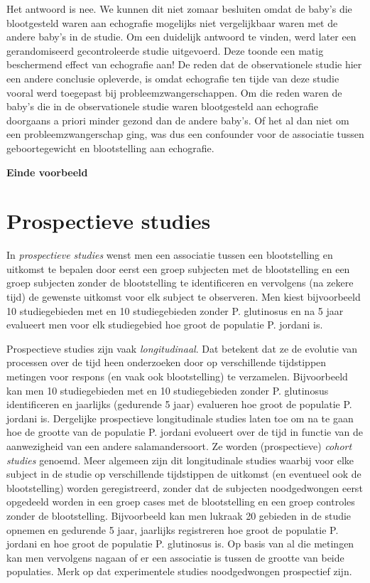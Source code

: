 \documentclass[
  12pt,dutch,coursenotes]{book}
\begin{document}
Het antwoord is nee. We kunnen dit niet zomaar besluiten omdat de baby's die blootgesteld waren aan echografie mogelijks niet vergelijkbaar waren met de andere baby's in de studie. Om een duidelijk antwoord te vinden, werd later een gerandomiseerd
gecontroleerde studie uitgevoerd. Deze toonde een matig beschermend effect
van echografie aan! De reden dat de observationele studie hier een andere
conclusie opleverde, is omdat echografie ten tijde van deze studie vooral
werd toegepast bij probleemzwangerschappen. Om die reden waren de baby's die
in de observationele studie waren blootgesteld aan echografie doorgaans a
priori minder gezond dan de andere baby's. Of het al dan niet om een
probleemzwangerschap ging, was dus een confounder voor de associatie tussen
geboortegewicht en blootstelling aan echografie.

\textbf{Einde voorbeeld}

\hypertarget{subsec:design:prosp}{%
\section{Prospectieve studies}\label{subsec:design:prosp}}

In \emph{prospectieve studies} wenst men een associatie tussen een
blootstelling en uitkomst te bepalen door eerst een groep subjecten met de
blootstelling en een groep subjecten zonder de blootstelling te
identificeren en vervolgens (na zekere tijd) de gewenste uitkomst voor elk subject
te observeren. Men kiest bijvoorbeeld 10 studiegebieden met en 10 studiegebieden zonder P. glutinosus en na 5 jaar evalueert men voor elk studiegebied hoe groot de populatie P. jordani is.

Prospectieve studies zijn vaak \emph{longitudinaal}. Dat betekent dat ze
de evolutie van processen over de tijd heen onderzoeken door op
verschillende tijdstippen metingen voor respons (en vaak ook blootstelling) te
verzamelen. Bijvoorbeeld kan men 10 studiegebieden met en 10 studiegebieden zonder P. glutinosus identificeren en jaarlijks (gedurende 5 jaar) evalueren hoe groot de populatie P. jordani is. Dergelijke prospectieve longitudinale studies laten toe om na te gaan hoe de grootte van de populatie P. jordani evolueert over de tijd in functie van de aanwezigheid van een andere salamandersoort. Ze
worden (prospectieve) \emph{cohort studies} genoemd. Meer algemeen zijn
dit longitudinale studies waarbij voor elke subject in de studie op
verschillende tijdstippen de uitkomst (en eventueel ook de blootstelling) worden geregistreerd,
zonder dat de subjecten noodgedwongen eerst opgedeeld worden in een groep
cases met de blootstelling en een groep controles zonder de blootstelling.
Bijvoorbeeld kan men lukraak 20 gebieden in de studie
opnemen en gedurende 5 jaar, jaarlijks registreren hoe groot de populatie P. jordani en hoe groot de populatie P. glutinosus is. Op
basis van al die metingen kan men vervolgens nagaan of er een associatie is
tussen de grootte van beide populaties. Merk op dat experimentele studies noodgedwongen prospectief zijn.
\end{document}
